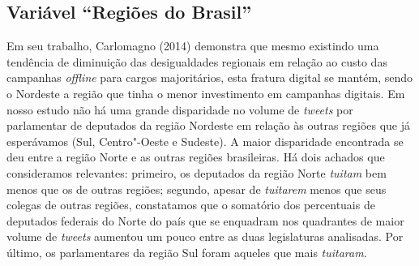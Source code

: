 \subsection{Variável ``Regiões do Brasil'' }

Em seu trabalho, Carlomagno (2014) demonstra que mesmo existindo uma
tendência de diminuição das desigualdades regionais em relação ao custo
das campanhas \emph{offline} para cargos majoritários, esta fratura digital se
mantém, sendo o Nordeste a região que tinha o menor investimento em
campanhas digitais. Em nosso estudo não há uma grande disparidade no
volume de \emph{tweets} por parlamentar de deputados da região Nordeste
em relação às outras regiões que já esperávamos (Sul, Centro"-Oeste e
Sudeste). A maior disparidade encontrada se deu entre a região Norte e
as outras regiões brasileiras. Há dois achados que consideramos
relevantes: primeiro, os deputados da região Norte \emph{tuitam} bem
menos que os de outras regiões; segundo, apesar de \emph{tuitarem} menos
que seus colegas de outras regiões, constatamos que o somatório dos
percentuais de deputados federais do Norte do país que se enquadram nos
quadrantes de maior volume de \emph{tweets} aumentou um pouco entre as
duas legislaturas analisadas. Por último, os parlamentares da região Sul
foram aqueles que mais \emph{tuitaram}.

